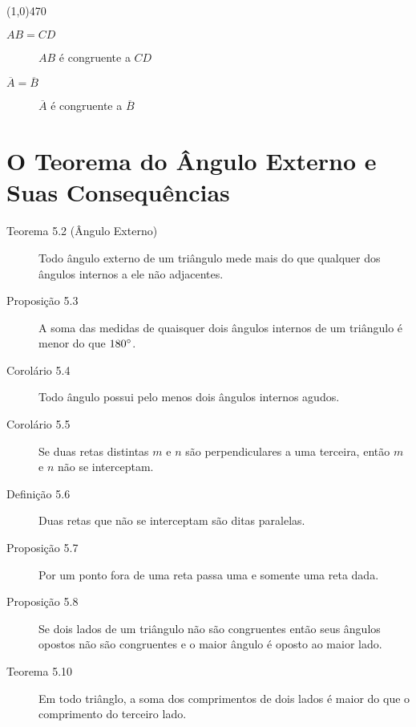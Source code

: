 \documentclass[11pt]{article}
\begin{document}
\line(1,0){470}

\begin{description}
  \item[$AB = CD$] $AB$ é congruente a $CD$
  \item[$\overline{A} = \overline{B}$] $\overline{A}$ é congruente a
    $\overline{B}$
\end{description}

\section{O Teorema do Ângulo Externo e Suas Consequências}

\begin{description}
  \item[Teorema 5.2 (Ângulo Externo)] Todo ângulo externo de um triângulo
    mede mais do que qualquer dos ângulos internos a ele não adjacentes.

  \item[Proposição 5.3] A soma das medidas de quaisquer dois ângulos
    internos de um triângulo é menor do que $180\degree$.

  \item[Corolário 5.4] Todo ângulo possui pelo menos dois ângulos internos
    agudos.

  \item[Corolário 5.5] Se duas retas distintas $m$ e $n$ são perpendiculares
    a uma terceira, então $m$ e $n$ não se interceptam.

  \item[Definição 5.6] Duas retas que não se interceptam são ditas paralelas.

  \item[Proposição 5.7] Por um ponto fora de uma reta passa uma e somente uma
    reta dada.

  \item[Proposição 5.8] Se dois lados de um triângulo não são congruentes
    então seus ângulos opostos não são congruentes e o maior ângulo é oposto
    ao maior lado.

  \item[Teorema 5.10] Em todo triânglo, a soma dos comprimentos de dois lados
    é maior do que o comprimento do terceiro lado.

\end{description}
\end{document}

